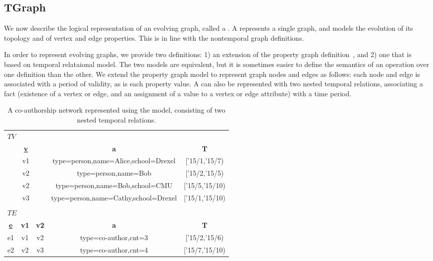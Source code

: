 \subsection{TGraph}

We now describe the logical representation of an evolving graph,
called a \tg.  A \tg represents a single graph, and models the
evolution of its topology and of vertex and edge properties.  This is
in line with the nontemporal graph definitions.  

In order to represent evolving graphs, we provide two definitions: 1)
an extension of the property graph
definition~\cite{DBLP:journals/corr/AnglesABHRV16}, and 2) one that is
based on temporal relataional model.  The two models are equivalent,
but it is sometimes easier to define the semantics of an operation
over one definition than the other.  We extend the property graph
model to represent graph nodes and edges as follows: each node and
edge is associated with a period of validity, as is each property
value.  A \tg can also be represented with two nested
temporal relations, associating a fact (existence of a vertex or edge,
and an assignment of a value to a vertex or edge attribute) with a
time period.

\begin{table*}
\caption{A co-authorship network represented using the \tg model,
  consisting of two nested temporal relations.}
\vspace{-0.2cm}
\label{tab:tg}
\centering
\begin{tabular}{| c | c | c | c | c |}
\hline
\multicolumn{5}{|l|}{$TV$} \\
\multicolumn{3}{|c}{\bfseries{\underline v}} & \multicolumn{1}{c}{\bfseries a} & \multicolumn{1}{c|}{\bfseries T}\\ \hline
\multicolumn{3}{|c|}{v1} & type=person,name=Alice,school=Drexel & ['15/1,'15/7) \\ \hline
\multicolumn{3}{|c|}{v2} & type=person,name=Bob & ['15/2,'15/5) \\ \hline
\multicolumn{3}{|c|}{v2} & type=person,name=Bob,school=CMU & ['15/5,'15/10) \\ \hline
\multicolumn{3}{|c|}{v3} & type=person,name=Cathy,school=Drexel & ['15/1,'15/10) \\ \hline
\multicolumn{5}{|l|}{} \\
\multicolumn{5}{|l|}{$TE$} \\
\multicolumn{1}{|c}{\bfseries{\underline e}} & \multicolumn{1}{c}{\bfseries v1} & \multicolumn{1}{c}{\bfseries v2} & \multicolumn{1}{c}{\bfseries a} & \multicolumn{1}{c|}{\bfseries T} \\ \hline
e1 & v1 & v2 & type=co-author,cnt=3 & ['15/2,'15/6) \\ \hline
e2 & v2 & v3 & type=co-author,cnt=4 & ['15/7,'15/10) \\ \hline
\end{tabular}
\vspace{-0.2cm}
\end{table*}

